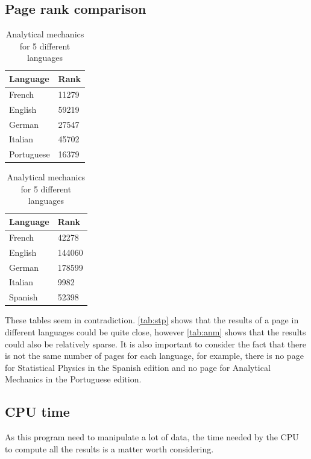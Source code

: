 \subsection{Page rank comparison}
\begin{table}[htbp]
    \begin{minipage}{.45\linewidth}
        \centering
        \begin{tabular}{ll}
            \toprule
            Language & Rank\\
            \midrule
            French & 11279\\
            English & 59219\\
            German & 27547\\
            Italian & 45702\\
            Portuguese & 16379\\
            \bottomrule
        \end{tabular}
        \caption{Statistical Physics for 5 different languages}\label{tab:stp}
    \end{minipage}
    \hfill
    \begin{minipage}{.45\linewidth}
        \centering
        \begin{tabular}{ll}
            \toprule
            Language & Rank\\
            \midrule
            French & 42278\\
            English & 144060\\
            German & 178599\\
            Italian & 9982\\
            Spanish & 52398\\
            \bottomrule
        \end{tabular}
        \caption{Analytical mechanics for 5 different languages}\label{tab:anm}
    \end{minipage}
\end{table}
These tables seem in contradiction. \autoref{tab:stp} shows that the results of a page in different languages could be quite close, however \autoref{tab:anm} shows that the results could also be relatively sparse. It is also important to consider the fact that there is not the same number of pages for each language, for example, there is no page for Statistical Physics in the Spanish edition and no page for Analytical Mechanics in the Portuguese edition. 

\newpage
\subsection{CPU time}
As this program need to manipulate a lot of data, the time needed by the CPU to compute all the results is a matter worth considering.


